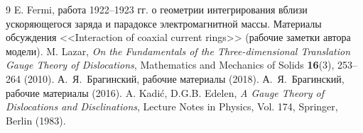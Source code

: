 \documentclass[12pt,a4paper]{article}
\begin{document}
\begin{thebibliography}{9}
 E. Fermi, работа 1922--1923 гг. о геометрии
интегрирования вблизи ускоряющегося заряда и парадоксе
электромагнитной массы.
 Материалы обсуждения <<Interaction of coaxial current
rings>> (рабочие заметки автора модели).
 M. Lazar, {\it On the Fundamentals of the
Three-dimensional Translation Gauge Theory of Dislocations},
Mathematics and Mechanics of Solids {\bf 16}(3), 253--264 (2010).
 А.~Я.~Брагинский, рабочие материалы (2018).
 А.~Я.~Брагинский, рабочие материалы (2016).
 A. Kadi\'c, D.G.B. Edelen, {\it A Gauge
Theory of Dislocations and Disclinations}, Lecture Notes in Physics,
Vol. 174, Springer, Berlin (1983).
\end{thebibliography}
\end{document}
